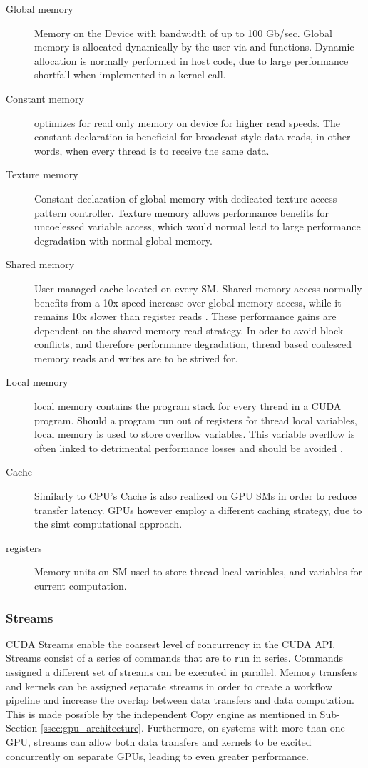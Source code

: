 \begin{description}
  \item [Global memory] Memory on the Device with bandwidth of up to 100 Gb/sec.
  Global memory is allocated dynamically by the user via  and  functions.
  Dynamic allocation is normally performed in host code, due to large performance shortfall
  when implemented in a kernel call.
  \item [Constant memory] optimizes for read only memory on device for higher
  read speeds.  The constant declaration is beneficial for broadcast style data
  reads, in other words, when every thread is to receive the same data.
  \item [Texture memory] Constant declaration of global memory with dedicated
   texture access pattern controller.  Texture memory allows performance benefits
   for uncoelessed variable access, which would normal lead to large performance
   degradation with normal global memory.
  \item [Shared memory] User managed cache located on every \gls{SM}.  Shared memory access
  normally benefits from a 10x speed increase over global memory access, while it remains
  10x slower than register reads \cite{Wilt}.  These performance gains are dependent
  on the shared memory read strategy.  In oder to avoid block conflicts, and therefore
  performance degradation, thread based coalesced memory reads and writes are to
  be strived for.
  \item [Local memory] local memory contains the program stack for every thread
  in a CUDA program. Should a program run out of registers for thread local variables,
  local memory is  used to store overflow variables. This variable overflow is often
  linked to detrimental performance losses and should be avoided \cite{Wilt}.
  \item [Cache] Similarly to CPU's Cache is also realized on GPU \glspl{SM} in order
  to reduce transfer latency.  \glspl{GPU} however employ a different caching strategy,
  due to the \gls{simt} computational approach.
  \item [registers] Memory units on \Gls{SM} used to store thread local variables,
                    and variables for current computation.
\end{description}

\subsubsection{Streams}\label{sssec:streams}
CUDA Streams enable the coarsest level of concurrency in the CUDA API.  Streams
 consist of a series of commands that are to run in series.  Commands assigned
a different set of streams can be executed in parallel. Memory transfers and
kernels can be assigned separate streams in order to create a workflow pipeline and increase
the overlap between data transfers and data computation. This is made possible by the
independent Copy engine as mentioned in Sub-Section \ref{ssec:gpu_architecture}.  Furthermore,
on systems with more than one \Gls{GPU}, streams can allow both data transfers and
kernels to be excited concurrently on separate \Glspl{GPU}, leading to even greater
performance.

